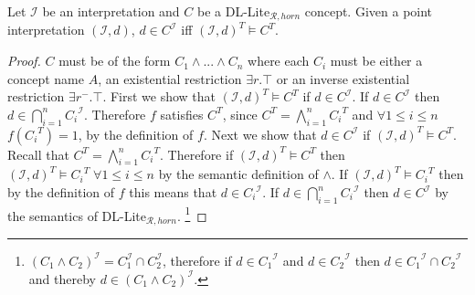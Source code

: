 \begin{lemma}
Let $\mathcal{I}$ be an interpretation and $C$ be a DL-Lite$_{\mathcal{R}, horn}$ concept. Given a point interpretation $(\mathcal{I}, d)$, $d \in C^{\mathcal{I}}$ iff $(\mathcal{I}, d)^T \models C^T$.
\end{lemma}
\begin{proof}
$C$ must be of the form $C_1 \wedge ... \wedge C_n$ where each  $C_i$ must be either a concept name $A$, an existential restriction $\exists r.\top$ or an inverse existential restriction $\exists r^{-}.\top$. \newline
First we show that $(\mathcal{I}, d)^T \models C^T$ if $d\in C^\mathcal{I}$.
\newline
If $d \in C^{\mathcal{I}}$ then $d\in \bigcap^{n}_{i=1}{C_{i}}^{\mathcal{I}}$. Therefore $f$ satisfies $C^T$, since $C^T = \bigwedge_{i = 1}^{n} {C_i}^T$ and $\forall 1 \leq i \leq n$ $f({C_i}^T) = 1$, by the definition of $f$.\newline
Next we show that $d\in C^\mathcal{I}$ if $(\mathcal{I}, d)^T \models C^T$.
\newline
Recall that $C^T = \bigwedge_{i = 1}^{n} {C_i}^T$. Therefore if $(\mathcal{I}, d)^T \models C^T$ then  $(\mathcal{I}, d) ^T \models {C_{i}}^T \; \forall 1 \leq i \leq n$ by the semantic definition of $\wedge$. If $(\mathcal{I}, d)^T \models {C_i }^T$ then by the definition of $f$ this means that $d\in{C_i}^\mathcal{I}$. If $d\in \bigcap^{n}_{i=1}{C_{i}}^{\mathcal{I}}$ then $d \in C^\mathcal{I}$ by the semantics of DL-Lite$_{\mathcal{R}, horn}$. \footnote{$ (C_{1} \wedge C_{2})^{\mathcal{I}} = C_{1}^{\mathcal{I}} \cap C_{2}^{\mathcal{I}} $, therefore if $d\in {C_1}^\mathcal{I}$ and $d\in {C_2}^{\mathcal{I}}$ then $d\in {C_1}^\mathcal{I} \cap {C_2}^\mathcal{I}$ and thereby $d\in (C_1 \wedge C_2)^\mathcal{I}$.}
\end{proof}
